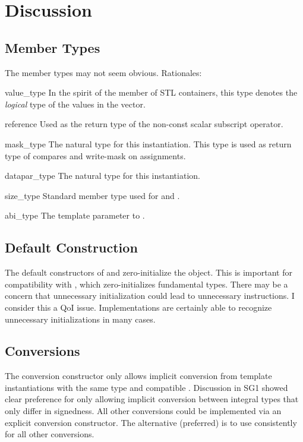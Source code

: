 \section{Discussion}

\subsection{Member Types}
The member types may not seem obvious.
Rationales:
\begin{typelist*}
  \item[value_type]
    In the spirit of the  member of STL containers, this type denotes the \emph{logical} type of the values in the vector.

  \item[reference]
    Used as the return type of the non-const scalar subscript operator.

  \item[mask_type]
    The natural \mask type for this \datapar instantiation.
    This type is used as return type of compares and write-mask on assignments.

  \item[datapar_type]
    The natural \datapar type for this \mask instantiation.

  \item[size_type]
    Standard member type used for  and .

  \item[abi_type]
    The  template parameter to \datapar.

\end{typelist*}

\subsection{Default Construction}
The default constructors of \datapar and \mask zero-initialize the object.
This is important for compatibility with , which zero-initializes fundamental types.
There may be a concern that unnecessary initialization could lead to unnecessary instructions.
I consider this a QoI issue.
Implementations are certainly able to recognize unnecessary initializations in many cases.

\subsection{Conversions}
The \datapar conversion constructor only allows implicit conversion from \datapar template instantiations with the same  type and compatible .
Discussion in SG1 showed clear preference for only allowing implicit conversion between integral types that only differ in signedness.
All other conversions could be implemented via an explicit conversion constructor.
The alternative (preferred) is to use \simdcast consistently for all other conversions.

